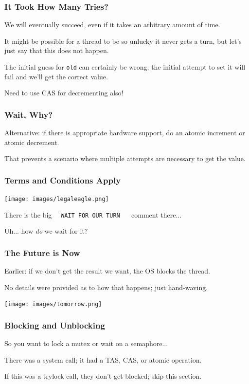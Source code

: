 \begin{frame}
\frametitle{It Took How Many Tries?}

We will eventually succeed, even if it takes an arbitrary amount of time.

 It might be possible for a thread to be so unlucky it never gets a turn, but let's just say that this does not happen.

The initial guess for \texttt{old} can certainly be wrong; the initial attempt to set it will fail and we'll get the correct value.

Need to use CAS for decrementing also!

\end{frame}

\begin{frame}
\frametitle{Wait, Why?}

Alternative: if there is appropriate hardware support, do an atomic increment or atomic decrement.

That prevents a scenario where multiple attempts are necessary to get the value. 

\end{frame}

\begin{frame}
\frametitle{Terms and Conditions Apply}

\begin{center}
	\texttt{[image: images/legaleagle.png]}
\end{center}

There is the big ~~\texttt{WAIT FOR OUR TURN} ~~ comment there...

Uh... how \textit{do} we wait for it?

\end{frame}

\begin{frame}
\frametitle{The Future is Now}

Earlier: if we don't get the result we want, the OS blocks the thread.

No details were provided as to how that happens; just hand-waving.

\begin{center}
	\texttt{[image: images/tomorrow.png]}
\end{center}

\end{frame}

\begin{frame}
\frametitle{Blocking and Unblocking}

So you want to lock a mutex or wait on a semaphore...

There was a system call; it had a TAS, CAS, or atomic operation.

If this was a trylock call, they don't get blocked; skip this section.

\end{frame}

